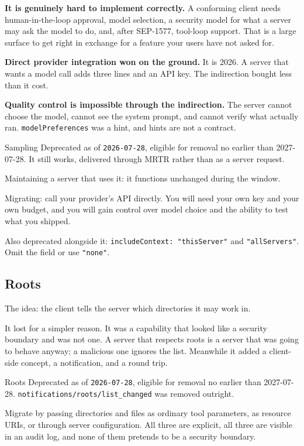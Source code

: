 \textbf{It is genuinely hard to implement correctly.} A conforming client needs
human-in-the-loop approval, model selection, a security model for what a server
may ask the model to do, and, after SEP-1577, tool-loop support. That is a large
surface to get right in exchange for a feature your users have not asked for.

\textbf{Direct provider integration won on the ground.} It is 2026. A server
that wants a model call adds three lines and an API key. The indirection bought
less than it cost.

\textbf{Quality control is impossible through the indirection.} The server
cannot choose the model, cannot see the system prompt, and cannot verify what
actually ran. \texttt{modelPreferences} was a hint, and hints are not a contract.

\begin{legacybox}{Sampling}
Deprecated as of \texttt{2026-07-28}, eligible for removal no earlier than
2027-07-28. It still works, delivered through MRTR rather than as a server
request.

Maintaining a server that uses it: it functions unchanged during the window.

Migrating: call your provider's API directly. You will need your own key and
your own budget, and you will gain control over model choice and the ability to
test what you shipped.

Also deprecated alongside it: \texttt{includeContext: "thisServer"} and
\texttt{"allServers"}. Omit the field or use \texttt{"none"}.
\end{legacybox}

\subsection{Roots}

The idea: the client tells the server which directories it may work in.

It lost for a simpler reason. It was a capability that looked like a security
boundary and was not one. A server that respects roots is a server that was
going to behave anyway; a malicious one ignores the list. Meanwhile it added a
client-side concept, a notification, and a round trip.

\begin{legacybox}{Roots}
Deprecated as of \texttt{2026-07-28}, eligible for removal no earlier than
2027-07-28. \texttt{notifications/roots/list\_changed} was removed outright.

Migrate by passing directories and files as ordinary tool parameters, as
resource URIs, or through server configuration. All three are explicit, all
three are visible in an audit log, and none of them pretends to be a security
boundary.
\end{legacybox}

